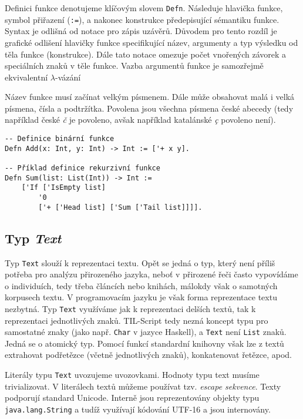 Definici funkce denotujeme klíčovým slovem \lstinline{Defn}. Následuje hlavička funkce, symbol
přiřazení (\lstinline{:=}), a nakonec konstrukce předepisující sémantiku funkce. Syntax je odlišná
od notace pro zápis uzávěrů. Důvodem pro tento rozdíl je grafické odlišení hlavičky funkce
specifikující název, argumenty a typ výsledku od těla funkce (konstrukce). Dále tato notace
omezuje počet vnořených závorek a speciálních znaků v těle funkce. Vazba argumentů funkce je
samozřejmě ekvivalentní $\lambda$-vázání

Název funkce musí začínat velkým písmenem. Dále může obsahovat malá i velká písmena, čísla
a podtržítka. Povolena jsou všechna písmena české abecedy (tedy například české \textit{č} je
povoleno, avšak například katalánské \textit{\c{c}} povoleno není).

\begin{lstlisting}[caption={Příklad definice funkcí}]
-- Definice binární funkce
Defn Add(x: Int, y: Int) -> Int := ['+ x y].

-- Příklad definice rekurzivní funkce
Defn Sum(list: List(Int)) -> Int :=
    ['If ['IsEmpty list]
        '0
        ['+ ['Head list] ['Sum ['Tail list]]]].
\end{lstlisting}

\subsection{Typ \textit{Text}}\label{text-type}

Typ \lstinline{Text} slouží k reprezentaci textu. Opět se jedná o typ, který není příliš potřeba
pro analýzu přirozeného jazyka, neboť v přirozené řeči často vypovídáme o individuích, tedy třeba
článcích nebo knihách, málokdy však o samotných korpusech textu. V programovacím jazyku je však
forma reprezentace textu nezbytná. Typ \lstinline{Text} využíváme jak k reprezentaci delších textů,
tak k reprezentaci jednotlivých znaků. TIL-Script tedy nezná koncept typu pro samostatné znaky (jako
např. \lstinline{Char} v jazyce Haskell), a \lstinline{Text} není \lstinline{List} znaků. Jedná se
o atomický typ. Pomocí funkcí standardní knihovny však lze z textů extrahovat podřetězce (včetně
jednotlivých znaků), konkatenovat řetězce, apod.

Literály typu \lstinline{Text} uvozujeme uvozovkami. Hodnoty typu text musíme
trivializovat. V literálech textů můžeme používat tzv. \textit{escape sekvence}. Texty podporují
standard Unicode. Interně jsou reprezentovány objekty typu \lstinline{java.lang.String} a tudíž
využívají kódování UTF-16 a jsou internovány.

